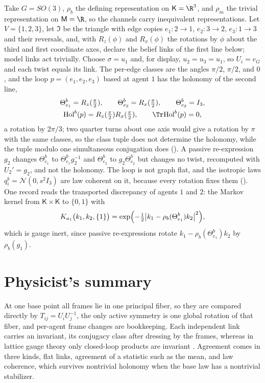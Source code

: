 Take $G=SO(3)$, $\rho_b$ the defining representation on $\mathsf K=\R^3$, and $\rho_m$ the trivial
representation on $\mathsf M=\R$, so the channels carry inequivalent representations. Let
$V=\{1,2,3\}$, let $\mathfrak I$ be the triangle with edge copies $e_1:2\to1$, $e_2:3\to2$, $e_3:1\to3$
and their reversals, and, with $R_z(\phi)$ and $R_x(\phi)$ the rotations by $\phi$ about the third and
first coordinate axes, declare the belief links of the first line below; model links act trivially.
Choose $\sigma=u_1$ and, for display, $u_2=u_3=u_1$, so $U_i=e_G$ and each twist equals its link. The
per-edge classes are the angles $\pi/2$, $\pi/2$, and $0$, and the loop $p=(e_1,e_2,e_3)$ based at
agent $1$ has the holonomy of the second line,
\begin{gather}
\Theta_{e_1}^b=R_z(\tfrac\pi2),
\qquad
\Theta_{e_2}^b=R_x(\tfrac\pi2),
\qquad
\Theta_{e_3}^b=I_3,
\label{eq:geo-running-links}\\
\mathrm{Hol}^b(p)=R_z(\tfrac\pi2)R_x(\tfrac\pi2),
\qquad
\Tr\mathrm{Hol}^b(p)=0,
\label{eq:geo-running-holonomy}
\end{gather}
a rotation by $2\pi/3$; two quarter turns about one axis would give a rotation by $\pi$ with the same
classes, so the class tuple does not determine the holonomy, while the tuple modulo one simultaneous
conjugation does (). A passive re-expression $g_2$ changes
$\Theta_{e_1}^b$ to $\Theta_{e_1}^bg_2^{-1}$ and $\Theta_{e_2}^b$ to $g_2\Theta_{e_2}^b$ but changes no
twist, recomputed with $U_2'=g_2$, and not the holonomy. The loop is not graph flat, and the isotropic
laws $q_i^b=\mathcal N(0,s^2I_3)$ are law coherent on it, because every rotation fixes them
(). One record reads the transported discrepancy of agents $1$ and $2$:
the Markov kernel from $\mathsf K\times\mathsf K$ to $\{0,1\}$ with
\begin{equation}
K_{a_1}\bigl(k_1,k_2,\{1\}\bigr)=\exp\Bigl(-\tfrac12\bigl\lvert k_1-\rho_b(\Theta_{e_1}^b)k_2\bigr\rvert^2\Bigr),
\label{eq:geo-running-record}
\end{equation}
which is gauge inert, since passive re-expressions rotate $k_1-\rho_b(\Theta_{e_1}^b)k_2$ by
$\rho_b(g_1)$.

\section*{Physicist's summary}

At one base point all frames lie in one principal fiber, so they are compared directly by
$T_{ij}=U_iU_j^{-1}$, the only active symmetry is one global rotation of that fiber, and per-agent frame
changes are bookkeeping. Each independent link carries an invariant, its conjugacy class after dressing
by the frames, whereas in lattice gauge theory only closed-loop products are invariant
\citep{WilsonConfinement1974}. Agreement comes in three kinds, flat links, agreement of a statistic such
as the mean, and law coherence, which survives nontrivial holonomy when the base law has a nontrivial
stabilizer.
